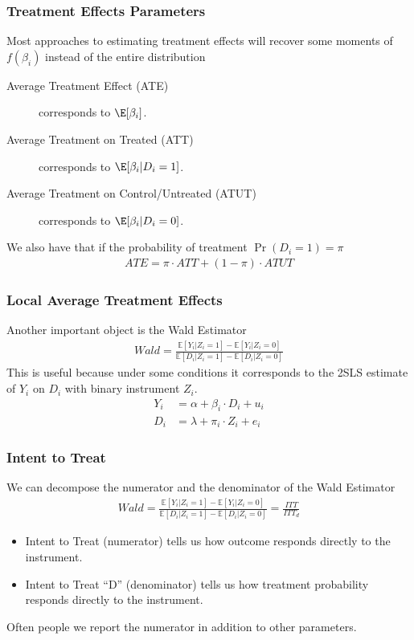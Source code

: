 \documentclass[aspectratio=169,11pt]{beamer}
\begin{document}
\begin{frame}
\frametitle{Treatment Effects Parameters}
Most approaches to estimating treatment effects will recover some moments of $f(\beta_i)$ instead of the entire distribution
\begin{description}
\item[Average Treatment Effect (ATE)] corresponds to $\E[\beta_i]$.
\item[Average Treatment on Treated (ATT)] corresponds to $\E[\beta_i | D_i = 1]$.
\item[Average Treatment on Control/Untreated (ATUT)] corresponds to $\E[\beta_i | D_i = 0]$.
\end{description}
We also have that if the probability of treatment $\Pr(D_i=1) = \pi$
\begin{align*}
ATE = \pi \cdot ATT + (1-\pi) \cdot ATUT
\end{align*}
\end{frame}

\begin{frame}
\frametitle{Local Average Treatment Effects}
Another important object is the \alert{Wald Estimator}
\begin{align*}
Wald = \frac{\mathbb{E}[Y_i | Z_i =1] - \mathbb{E}[Y_i | Z_i =0]}{\mathbb{E}[D_i  | Z_i =1] - \mathbb{E}[D_i | Z_i =0]} 
\end{align*}
This is useful because under some conditions it corresponds to the 2SLS estimate of $Y_i$ on $D_i$ with binary instrument $Z_i$.
\begin{align*}
Y_i &= \alpha + \beta_i \cdot D_i + u_i \\
D_i &= \lambda + \pi_i \cdot Z_i + e_i
\end{align*}
\end{frame}


\begin{frame}
\frametitle{Intent to Treat}
We can decompose the numerator and the denominator of the \alert{Wald Estimator}
\begin{align*}
Wald = \frac{\mathbb{E}[Y_i | Z_i =1] - \mathbb{E}[Y_i | Z_i =0]}{\mathbb{E}[D_i  | Z_i =1] - \mathbb{E}[D_i | Z_i =0]}  = \frac{ITT}{ITT_d}
\end{align*}
\begin{itemize}
\item \alert{Intent to Treat} (numerator) tells us how outcome responds directly to the instrument.
\item \alert{Intent to Treat ``D''} (denominator) tells us how treatment probability responds directly to the instrument.
\end{itemize}
Often people we report the numerator in addition to other parameters.
\end{frame}
\end{document}
